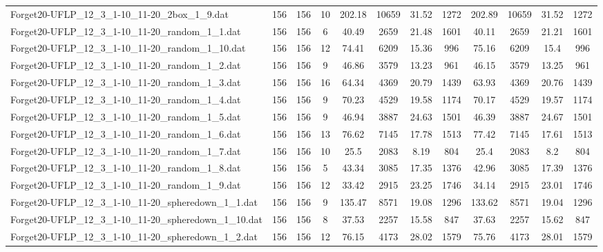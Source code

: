 \begin{sidewaystable}[!ht]
{\begin{tabular}{lccccccccccc}
Forget20-UFLP\_12\_3\_1-10\_11-20\_2box\_1\_9.dat & 156 & 156 & 10 & 202.18 & 10659 &  \textcolor{blue2}{31.52} & 1272 & 202.89 & 10659 &  \textcolor{blue2}{31.52} & 1272 \\
Forget20-UFLP\_12\_3\_1-10\_11-20\_random\_1\_1.dat & 156 & 156 & 6 & 40.49 & 2659 & 21.48 & 1601 & 40.11 & 2659 &  \textcolor{blue2}{21.21} & 1601 \\
Forget20-UFLP\_12\_3\_1-10\_11-20\_random\_1\_10.dat & 156 & 156 & 12 & 74.41 & 6209 & 15.36 & 996 & 75.16 & 6209 & 15.4 & 996 \\
Forget20-UFLP\_12\_3\_1-10\_11-20\_random\_1\_2.dat & 156 & 156 & 9 & 46.86 & 3579 & 13.23 & 961 & 46.15 & 3579 & 13.25 & 961 \\
Forget20-UFLP\_12\_3\_1-10\_11-20\_random\_1\_3.dat & 156 & 156 & 16 & 64.34 & 4369 & 20.79 & 1439 & 63.93 & 4369 &  \textcolor{blue2}{20.76} & 1439 \\
Forget20-UFLP\_12\_3\_1-10\_11-20\_random\_1\_4.dat & 156 & 156 & 9 & 70.23 & 4529 & 19.58 & 1174 & 70.17 & 4529 &  \textcolor{blue2}{19.57} & 1174 \\
Forget20-UFLP\_12\_3\_1-10\_11-20\_random\_1\_5.dat & 156 & 156 & 9 & 46.94 & 3887 & 24.63 & 1501 & 46.39 & 3887 & 24.67 & 1501 \\
Forget20-UFLP\_12\_3\_1-10\_11-20\_random\_1\_6.dat & 156 & 156 & 13 & 76.62 & 7145 & 17.78 & 1513 & 77.42 & 7145 &  \textcolor{blue2}{17.61} & 1513 \\
Forget20-UFLP\_12\_3\_1-10\_11-20\_random\_1\_7.dat & 156 & 156 & 10 & 25.5 & 2083 &  \textcolor{blue2}{8.19} & 804 & 25.4 & 2083 & 8.2 & 804 \\
Forget20-UFLP\_12\_3\_1-10\_11-20\_random\_1\_8.dat & 156 & 156 & 5 & 43.34 & 3085 & 17.35 & 1376 & 42.96 & 3085 & 17.39 & 1376 \\
Forget20-UFLP\_12\_3\_1-10\_11-20\_random\_1\_9.dat & 156 & 156 & 12 & 33.42 & 2915 & 23.25 & 1746 & 34.14 & 2915 &  \textcolor{blue2}{23.01} & 1746 \\
Forget20-UFLP\_12\_3\_1-10\_11-20\_spheredown\_1\_1.dat & 156 & 156 & 9 & 135.47 & 8571 & 19.08 & 1296 & 133.62 & 8571 &  \textcolor{blue2}{19.04} & 1296 \\
Forget20-UFLP\_12\_3\_1-10\_11-20\_spheredown\_1\_10.dat & 156 & 156 & 8 & 37.53 & 2257 & 15.58 & 847 & 37.63 & 2257 & 15.62 & 847 \\
Forget20-UFLP\_12\_3\_1-10\_11-20\_spheredown\_1\_2.dat & 156 & 156 & 12 & 76.15 & 4173 & 28.02 & 1579 & 75.76 & 4173 &  \textcolor{blue2}{28.01} & 1579 \\

\end{tabular}}
\end{sidewaystable}
